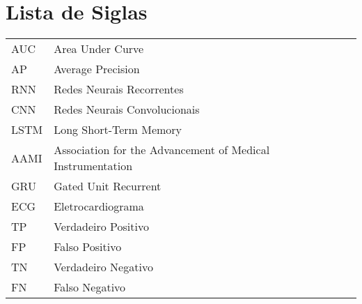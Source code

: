 \chapter*{Lista de Siglas} 
\begin{tabular}{ll}
AUC & Area Under Curve \\
AP & Average Precision \\
RNN & Redes Neurais Recorrentes \\
CNN & Redes Neurais Convolucionais \\
LSTM & Long Short-Term Memory \\
AAMI & Association for the Advancement of Medical Instrumentation   \\
GRU & Gated Unit Recurrent \\
ECG & Eletrocardiograma \\
TP & Verdadeiro Positivo \\
FP & Falso Positivo \\
TN & Verdadeiro Negativo \\
FN & Falso Negativo \\
\end{tabular}